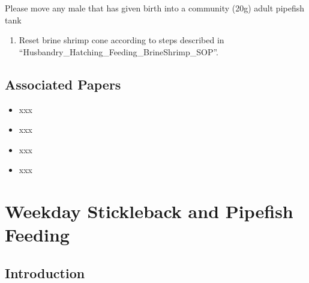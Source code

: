 \documentclass[
  letterpaper,
  DIV=11,
  numbers=noendperiod]{scrreprt}
\providecommand{\tightlist}{%
  \setlength{\itemsep}{0pt}\setlength{\parskip}{0pt}}\usepackage{longtable,booktabs,array}
\begin{document}
\begin{tcolorbox}[enhanced jigsaw, toprule=.15mm, breakable, coltitle=black, leftrule=.75mm, title=\textcolor{quarto-callout-warning-color}{\faExclamationTriangle}\hspace{0.5em}{NOTES}, bottomrule=.15mm, toptitle=1mm, bottomtitle=1mm, colframe=quarto-callout-warning-color-frame, opacityback=0, colback=white, opacitybacktitle=0.6, colbacktitle=quarto-callout-warning-color!10!white, rightrule=.15mm, titlerule=0mm, arc=.35mm, left=2mm]

Please move any male that has given birth into a community (20g) adult
pipefish tank

\end{tcolorbox}

\begin{enumerate}
\def\labelenumi{\arabic{enumi}.}
\setcounter{enumi}{4}
\tightlist
\item
  Reset brine shrimp cone according to steps described in
  ``Husbandry\_Hatching\_Feeding\_BrineShrimp\_SOP''.
\end{enumerate}

\hypertarget{associated-papers-32}{%
\section{Associated Papers}\label{associated-papers-32}}

\begin{itemize}
\tightlist
\item
  xxx
\item
  xxx
\item
  xxx
\item
  xxx
\end{itemize}

\hypertarget{sec-husbandry-weekday_feeding}{%
\chapter{Weekday Stickleback and Pipefish
Feeding}\label{sec-husbandry-weekday_feeding}}

\hypertarget{introduction-48}{%
\section{Introduction}\label{introduction-48}}
\end{document}
